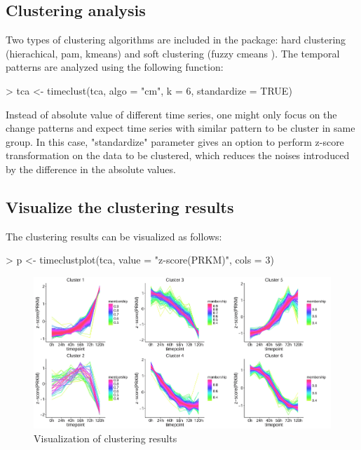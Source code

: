 \documentclass[a4paper]{article}
\begin{document}
\subsection{Clustering analysis}
Two types of clustering algorithms are included in the package: hard clustering (hierachical, pam, kmeans) and soft clustering (fuzzy cmeans \cite{Futschik}). The temporal patterns are analyzed using the following function:
\begin{Schunk}
\begin{Sinput}
> tca <- timeclust(tca, algo = "cm", k = 6, standardize = TRUE)
\end{Sinput}
\end{Schunk}
Instead of absolute value of different time series, one might only focus on the change patterns and expect time series with similar pattern to be cluster in same group. In this case, "standardize" parameter gives an option to perform z-score transformation on the data to be clustered, which reduces the noises introduced by the difference in the absolute values.

\subsection{Visualize the clustering results}
The clustering results can be visualized as follows:
\begin{Schunk}
\begin{Sinput}
> p <- timeclustplot(tca, value = "z-score(PRKM)", cols = 3)
\end{Sinput}
\end{Schunk}

\begin{figure}[H]
\centering
        \includegraphics[width=\textwidth]{clusterRes.png}
    \caption{Visualization of clustering results}
\end{figure}
\end{document}
